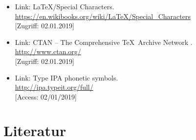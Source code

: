 \documentclass[a4paper,10pt,handout]{beamer}
\begin{document}
\begin{frame}[allowframebreaks]
{\begin{itemize}
		\item Link: \LaTeX /Special Characters.\\
		\url{https://en.wikibooks.org/wiki/LaTeX/Special_Characters}\\
		{[}Zugriff: 02.01.2019]
		
		\item Link: CTAN -- The Comprehensive \TeX\ Archive Network .\\
		\url{http://www.ctan.org/}\\
		{[}Zugriff: 02.01.2019]
		
		\item Link: Type IPA phonetic symbols.\\
		\url{http://ipa.typeit.org/full/}\\
		{[}Access: 02/01/2019]

%		
%		
%		
%		
		
	\end{itemize}
}

\end{frame}


\section{Literatur}
\end{document}

